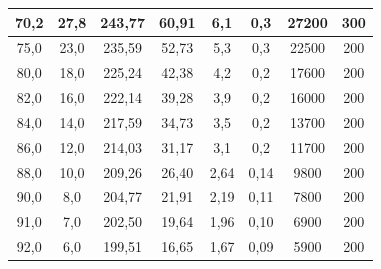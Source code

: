 \documentclass[a4paper,12pt,spanish]{article}
\begin{document}
\begin{table}[H]
\begin{tabular}{cccccccc}
			\multicolumn{1}{|c|}{70,2} & \multicolumn{1}{c|}{27,8} & \multicolumn{1}{c|}{243,77} & \multicolumn{1}{c|}{60,91} & \multicolumn{1}{c|}{6,1} & \multicolumn{1}{c|}{0,3} & \multicolumn{1}{c|}{27200} & \multicolumn{1}{c|}{300} \\ \hline
			\multicolumn{1}{|c|}{75,0} & \multicolumn{1}{c|}{23,0} & \multicolumn{1}{c|}{235,59} & \multicolumn{1}{c|}{52,73} & \multicolumn{1}{c|}{5,3} & \multicolumn{1}{c|}{0,3} & \multicolumn{1}{c|}{22500} & \multicolumn{1}{c|}{200} \\ \hline
			\multicolumn{1}{|c|}{80,0} & \multicolumn{1}{c|}{18,0} & \multicolumn{1}{c|}{225,24} & \multicolumn{1}{c|}{42,38} & \multicolumn{1}{c|}{4,2} & \multicolumn{1}{c|}{0,2} & \multicolumn{1}{c|}{17600} & \multicolumn{1}{c|}{200} \\ \hline
			\multicolumn{1}{|c|}{82,0} & \multicolumn{1}{c|}{16,0} & \multicolumn{1}{c|}{222,14} & \multicolumn{1}{c|}{39,28} & \multicolumn{1}{c|}{3,9} & \multicolumn{1}{c|}{0,2} & \multicolumn{1}{c|}{16000} & \multicolumn{1}{c|}{200} \\ \hline
			\multicolumn{1}{|c|}{84,0} & \multicolumn{1}{c|}{14,0} & \multicolumn{1}{c|}{217,59} & \multicolumn{1}{c|}{34,73} & \multicolumn{1}{c|}{3,5} & \multicolumn{1}{c|}{0,2} & \multicolumn{1}{c|}{13700} & \multicolumn{1}{c|}{200} \\ \hline
			\multicolumn{1}{|c|}{86,0} & \multicolumn{1}{c|}{12,0} & \multicolumn{1}{c|}{214,03} & \multicolumn{1}{c|}{31,17} & \multicolumn{1}{c|}{3,1} & \multicolumn{1}{c|}{0,2} & \multicolumn{1}{c|}{11700} & \multicolumn{1}{c|}{200} \\ \hline
			\multicolumn{1}{|c|}{88,0} & \multicolumn{1}{c|}{10,0} & \multicolumn{1}{c|}{209,26} & \multicolumn{1}{c|}{26,40} & \multicolumn{1}{c|}{2,64} & \multicolumn{1}{c|}{0,14} & \multicolumn{1}{c|}{9800} & \multicolumn{1}{c|}{200} \\ \hline
			\multicolumn{1}{|c|}{90,0} & \multicolumn{1}{c|}{8,0} & \multicolumn{1}{c|}{204,77} & \multicolumn{1}{c|}{21,91} & \multicolumn{1}{c|}{2,19} & \multicolumn{1}{c|}{0,11} & \multicolumn{1}{c|}{7800} & \multicolumn{1}{c|}{200} \\ \hline
			\multicolumn{1}{|c|}{91,0} & \multicolumn{1}{c|}{7,0} & \multicolumn{1}{c|}{202,50} & \multicolumn{1}{c|}{19,64} & \multicolumn{1}{c|}{1,96} & \multicolumn{1}{c|}{0,10} & \multicolumn{1}{c|}{6900} & \multicolumn{1}{c|}{200} \\ \hline
			\multicolumn{1}{|c|}{92,0} & \multicolumn{1}{c|}{6,0} & \multicolumn{1}{c|}{199,51} & \multicolumn{1}{c|}{16,65} & \multicolumn{1}{c|}{1,67} & \multicolumn{1}{c|}{0,09} & \multicolumn{1}{c|}{5900} & \multicolumn{1}{c|}{200} \\ \hline

\end{tabular}
\end{table}
\end{document}
